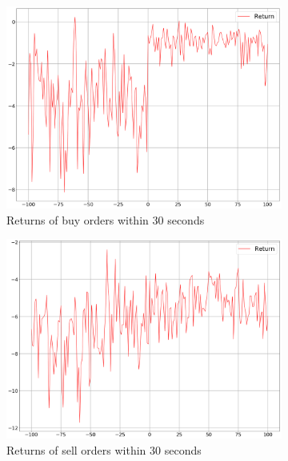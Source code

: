 \begin{figure}[H]
\begin{subfigure}[b]{0.45\textwidth}
        \includegraphics[width=\textwidth]{images/behaviour-up-30s-buy.png}
        \caption{Returns of buy orders within 30 seconds}
        \label{fig:behvaiour-up-30s-buy}
    \end{subfigure}
    \begin{subfigure}[b]{0.45\textwidth}
        \includegraphics[width=\textwidth]{images/behaviour-up-30s-sell.png}
        \caption{Returns of sell orders within 30 seconds}
        \label{fig:behvaiour-up-30s-sell}
    \end{subfigure}
    \begin{subfigure}[b]{0.45\textwidth}

\end{subfigure}
\end{figure}
